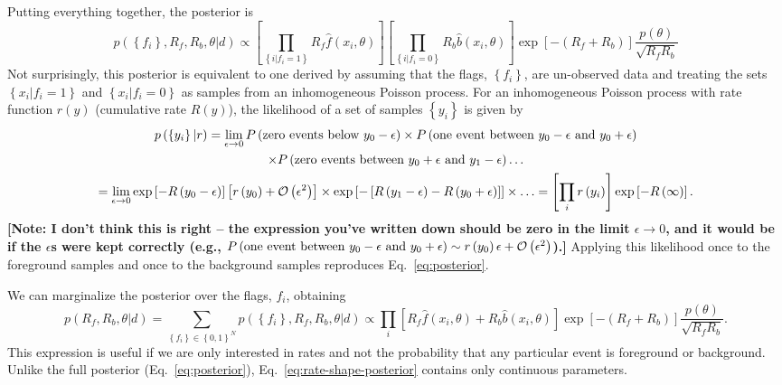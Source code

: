 \documentclass[aps,prd]{revtex4-1}
\newcommand{\order}[1]{\mathcal{O}\left( #1 \right)}
\newcommand{\mathset}[1]{\left\{ #1 \right\}}
\newcommand{\ilya}[1]{{\color{red} \bf #1}}
\begin{document}
Putting everything together, the posterior is
\begin{equation}
  \label{eq:posterior}
  p\left( \mathset{f_i}, R_f, R_b, \theta | d \right) \propto \left[
    \prod_{\mathset{i | f_i = 1}} R_f \hat{f}\left(x_i, \theta\right) \right]
  \left[ \prod_{\mathset{i | f_i = 0}} R_b \hat{b}\left( x_i, \theta\right)
  \right] \exp\left[ - \left(R_f + R_b\right) \right]
  \frac{p(\theta)}{\sqrt{R_f R_b}}
\end{equation}
Not surprisingly, this posterior is equivalent to one derived by
assuming that the flags, $\mathset{f_i}$, are un-observed data and
treating the sets $\mathset{x_i | f_i = 1}$ and $\mathset{x_i | f_i =
  0}$ as samples from an inhomogeneous Poisson process.  For an
inhomogeneous Poisson process with rate function $r(y)$ (cumulative
rate $R(y)$), the likelihood of a set of samples $\mathset{y_i}$ is
given by 
\begin{multline}
  p\left( \mathset{y_i} | r \right) = \lim_{\epsilon \to 0} P\left(
  \textnormal{zero events below } y_0 - \epsilon \right) \times
  P\left( \textnormal{one event between } y_0 - \epsilon \textnormal{
    and } y_0 + \epsilon \right) \\ \times P\left( \textnormal{zero
    events between } y_0+\epsilon \textnormal{ and } y_1 - \epsilon
  \right) \ldots \\ = \lim_{\epsilon \to 0} \exp\left[ - R\left(y_0 -
    \epsilon \right) \right] \left[ r\left( y_0 \right) +
    \order{\epsilon^2} \right] \times \exp\left[ - \left[ R\left( y_1
      - \epsilon\right) - R\left( y_0 + \epsilon\right) \right]
    \right] \times \ldots = \left[\prod_i r\left( y_i
    \right)\right] \exp\left[ - R\left( \infty \right) \right].
\end{multline}
\ilya{[Note: I don't think this is right -- the expression you've written down should be zero in the limit $\epsilon \to 0$, and it would be if the $\epsilon$s were kept correctly (e.g., $ P\left( \textnormal{one event between } y_0 - \epsilon \textnormal{ and } y_0 + \epsilon \right) \sim  r\left( y_0 \right) \epsilon +
    \order{\epsilon^2}$).]}
Applying this likelihood once to the foreground samples and once to
the background samples reproduces Eq.~\eqref{eq:posterior}.

We can marginalize the posterior over the flags, $f_i$, obtaining
\begin{equation}
  \label{eq:rate-shape-posterior}
  p\left( R_f, R_b, \theta | d \right) = \sum_{\mathset{f_i} \in
    \mathset{0,1}^N} p\left( \mathset{f_i}, R_f, R_b, \theta | d \right)
  \propto \prod_{i} \left[ R_f \hat{f}\left(x_i, \theta\right) + R_b
    \hat{b}\left( x_i, \theta\right) \right] \exp\left[-\left( R_f +
      R_b \right) \right] \frac{p(\theta)}{\sqrt{R_f R_b}}.
\end{equation}
This expression is useful if we are only interested in rates and not
the probability that any particular event is foreground or background.
Unlike the full posterior (Eq.~\eqref{eq:posterior}),
Eq.~\eqref{eq:rate-shape-posterior} contains only continuous
parameters.
\end{document}
